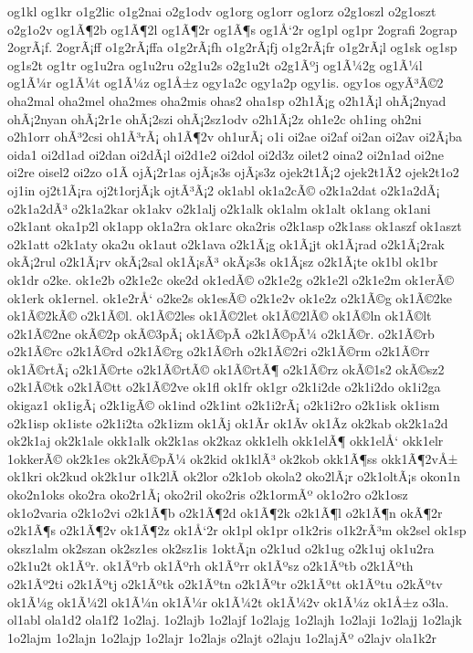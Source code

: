 {og1kl
og1kr
o1g2lic
o1g2nai
o2g1odv
og1org
og1orr
og1orz
o2g1oszl
o2g1oszt
o2g1o2v
og1Ã¶2b
og1Ã¶2l
og1Ã¶2r
og1Ã¶s
og1Å‘2r
og1pl
og1pr
2ografi
2ograp
2ogrÃ¡f.
2ogrÃ¡ff
o1g2rÃ¡ffa
o1g2rÃ¡fh
o1g2rÃ¡fj
o1g2rÃ¡fr
o1g2rÃ¡l
og1sk
og1sp
og1s2t
og1tr
og1u2ra
og1u2ru
o2g1u2s
o2g1u2t
o2g1Ãºj
og1Ã¼2g
og1Ã¼l
og1Ã¼r
og1Ã¼t
og1Ã¼z
og1Å±z
ogy1a2c
ogy1a2p
ogy1is.
ogy1os
ogyÃ³Ã©2
oha2mal
oha2mel
oha2mes
oha2mis
ohas2
oha1sp
o2h1Ã¡g
o2h1Ã¡l
ohÃ¡2nyad
ohÃ¡2nyan
ohÃ¡2r1e
ohÃ¡2szi
ohÃ¡2sz1odv
o2h1Ã¡2z
oh1e2c
oh1ing
oh2ni
o2h1orr
ohÃ³2csi
oh1Ã³rÃ¡
oh1Ã¶2v
oh1urÃ¡
o1i
oi2ae
oi2af
oi2an
oi2av
oi2Ã¡ba
oida1
oi2d1ad
oi2dan
oi2dÃ¡l
oi2d1e2
oi2dol
oi2d3z
oilet2
oina2
oi2n1ad
oi2ne
oi2re
oisel2
oi2zo
o1Ã­
ojÃ¡2r1as
ojÃ¡s3s
ojÃ¡s3z
ojek2t1Ã¡2
ojek2t1Ã­2
ojek2t1o2
oj1in
oj2t1Ã¡ra
oj2t1orjÃ¡k
ojtÃ³Ã¡2
ok1abl
ok1a2cÃ©
o2k1a2dat
o2k1a2dÃ¡
o2k1a2dÃ³
o2k1a2kar
ok1akv
o2k1alj
o2k1alk
ok1alm
ok1alt
ok1ang
ok1ani
o2k1ant
oka1p2l
ok1app
ok1a2ra
ok1arc
oka2ris
o2k1asp
o2k1ass
ok1aszf
ok1aszt
o2k1att
o2k1aty
oka2u
ok1aut
o2k1ava
o2k1Ã¡g
ok1Ã¡jt
ok1Ã¡rad
o2k1Ã¡2rak
okÃ¡2rul
o2k1Ã¡rv
okÃ¡2sal
ok1Ã¡sÃ³
okÃ¡s3s
ok1Ã¡sz
o2k1Ã¡te
ok1bl
ok1br
ok1dr
o2ke.
ok1e2b
o2k1e2c
oke2d
ok1edÃ©
o2k1e2g
o2k1e2l
o2k1e2m
ok1erÃ©
ok1erk
ok1ernel.
ok1e2rÅ‘
o2ke2s
ok1esÃ©
o2k1e2v
ok1e2z
o2k1Ã©g
ok1Ã©2ke
ok1Ã©2kÃ©
o2k1Ã©l.
ok1Ã©2les
ok1Ã©2let
ok1Ã©2lÃ©
ok1Ã©ln
ok1Ã©lt
o2k1Ã©2ne
okÃ©2p
okÃ©3pÃ¡
ok1Ã©pÃ­
o2k1Ã©pÃ¼
o2k1Ã©r.
o2k1Ã©rb
o2k1Ã©rc
o2k1Ã©rd
o2k1Ã©rg
o2k1Ã©rh
o2k1Ã©2ri
o2k1Ã©rm
o2k1Ã©rr
ok1Ã©rtÃ¡
o2k1Ã©rte
o2k1Ã©rtÃ©
ok1Ã©rtÃ¶
o2k1Ã©rz
okÃ©1s2
okÃ©sz2
o2k1Ã©tk
o2k1Ã©tt
o2k1Ã©2ve
ok1fl
ok1fr
ok1gr
o2k1i2de
o2k1i2do
ok1i2ga
okigaz1
ok1igÃ¡
o2k1igÃ©
ok1ind
o2k1int
o2k1i2rÃ¡
o2k1i2ro
o2k1isk
ok1ism
o2k1isp
ok1iste
o2k1i2ta
o2k1izm
ok1Ã­j
ok1Ã­r
ok1Ã­v
ok1Ã­z
ok2kab
ok2k1a2d
ok2k1aj
ok2k1ale
okk1alk
ok2k1as
ok2kaz
okk1elh
okk1elÃ¶
okk1elÅ‘
okk1elr
1okkerÃ©
ok2k1es
ok2kÃ©pÃ¼
ok2kid
ok1klÃ³
ok2kob
okk1Ã¶ss
okk1Ã¶2vÅ±
ok1kri
ok2kud
ok2k1ur
o1k2lÃ­
ok2lor
o2k1ob
okola2
oko2lÃ¡r
o2k1oltÃ¡s
okon1n
oko2n1oks
oko2ra
oko2r1Ã¡
oko2ril
oko2ris
o2k1ormÃº
ok1o2ro
o2k1osz
ok1o2varia
o2k1o2vi
o2k1Ã¶b
o2k1Ã¶2d
ok1Ã¶2k
o2k1Ã¶l
o2k1Ã¶n
okÃ¶2r
o2k1Ã¶s
o2k1Ã¶2v
ok1Ã¶2z
ok1Å‘2r
ok1pl
ok1pr
o1k2ris
o1k2rÃ³m
ok2sel
ok1sp
oksz1alm
ok2szan
ok2sz1es
ok2sz1is
1oktÃ¡n
o2k1ud
o2k1ug
o2k1uj
ok1u2ra
o2k1u2t
ok1Ãºr.
ok1Ãºrb
ok1Ãºrh
ok1Ãºrr
ok1Ãºsz
o2k1Ãºtb
o2k1Ãºth
o2k1Ãº2ti
o2k1Ãºtj
o2k1Ãºtk
o2k1Ãºtn
o2k1Ãºtr
o2k1Ãºtt
ok1Ãºtu
o2kÃºtv
ok1Ã¼g
ok1Ã¼2l
ok1Ã¼n
ok1Ã¼r
ok1Ã¼2t
ok1Ã¼2v
ok1Ã¼z
ok1Å±z
o3la.
ol1abl
ola1d2
ola1f2
1o2laj.
1o2lajb
1o2lajf
1o2lajg
1o2lajh
1o2laji
1o2lajj
1o2lajk
1o2lajm
1o2lajn
1o2lajp
1o2lajr
1o2lajs
o2lajt
o2laju
1o2lajÃº
o2lajv
ola1k2r
}
